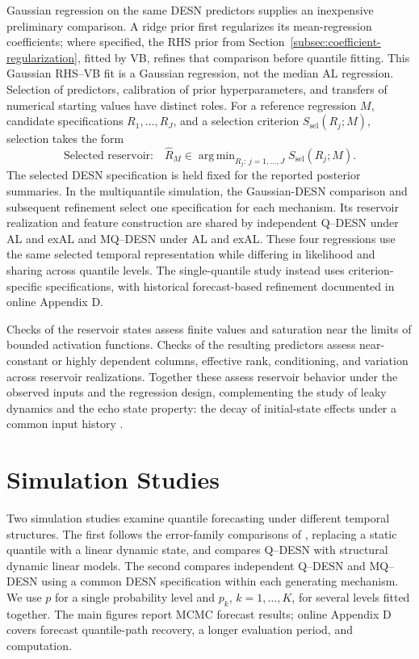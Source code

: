 \documentclass[12pt,letterpaper]{article}
\numberwithin{equation}{section}
\DeclareMathOperator{\argmin}{arg\,min}
\begin{document}
Gaussian regression on the same DESN predictors supplies an inexpensive
preliminary comparison. A ridge prior first regularizes its mean-regression
coefficients; where specified, the RHS prior from
Section~\ref{subsec:coefficient-regularization}, fitted by VB, refines that
comparison before quantile fitting. This Gaussian RHS--VB fit is a Gaussian
regression, not the median AL regression. Selection of predictors, calibration
of prior hyperparameters, and transfers of numerical starting values have
distinct roles. For a
reference regression \(M\), candidate specifications \(R_1,\ldots,R_J\),
and a selection criterion \(S_{\mathrm{sel}}(R_j;M)\), selection takes
the form
\begin{equation}
\text{Selected reservoir:}\quad \widehat R_M
\in\argmin_{R_j:\,j=1,\ldots,J}
S_{\mathrm{sel}}(R_j;M).
\label{eq:reservoir-selection-main}
\end{equation}
The selected DESN specification is held fixed for the reported posterior
summaries. In the
multiquantile simulation, the Gaussian-DESN comparison and subsequent refinement select
one specification for each mechanism. Its reservoir realization and feature
construction are shared by independent Q--DESN under AL and exAL and
MQ--DESN under AL and exAL. These four regressions
use the same selected temporal representation while differing in likelihood
and sharing across quantile levels. The single-quantile study instead uses
criterion-specific specifications, with historical forecast-based refinement
documented in online Appendix D.

Checks of the reservoir states assess finite values and saturation near the
limits of bounded activation functions. Checks of the resulting
predictors assess near-constant or highly dependent columns, effective rank,
conditioning, and variation across reservoir realizations. Together these
assess reservoir behavior under the observed inputs and the regression design, complementing the
study of leaky dynamics and the echo state property: the decay of initial-state
effects under a common input history
\citep{JaegerLukoseviciusPopoviciSiewert2007LeakyESN,
YildizJaegerKiebel2012ESP}.


\section{Simulation Studies}
\label{sec:simulation}

\noindent
Two simulation studies examine quantile forecasting under different temporal
structures. The first follows the error-family comparisons of
\citet{yan2025new}, replacing a static quantile with a linear dynamic state,
and compares Q--DESN with structural dynamic linear models. The second
compares independent Q--DESN and MQ--DESN using a common DESN specification
within each generating mechanism. We use \(p\) for a single probability
level and \(p_k\), \(k=1,\ldots,K\), for several levels fitted together.
The main figures report MCMC forecast results; online Appendix D covers
forecast quantile-path recovery, a longer evaluation period, and computation.
\end{document}
